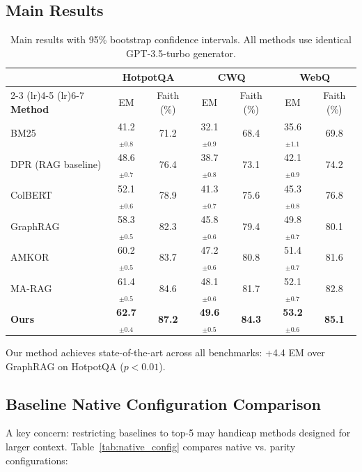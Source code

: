 \documentclass[10pt,twocolumn]{article}
\begin{document}
\subsection{Main Results}

\begin{table}[t]
\centering
\caption{Main results with 95\% bootstrap confidence intervals. All methods use identical GPT-3.5-turbo generator.}
\label{tab:main}
\small
\begin{tabular}{@{}lcccccc@{}}
\toprule
& \multicolumn{2}{c}{\textbf{HotpotQA}} & \multicolumn{2}{c}{\textbf{CWQ}} & \multicolumn{2}{c}{\textbf{WebQ}} \\
\cmidrule(lr){2-3} \cmidrule(lr){4-5} \cmidrule(lr){6-7}
\textbf{Method} & EM & Faith (\%) & EM & Faith (\%) & EM & Faith (\%) \\
\midrule
BM25 & 41.2$_{\pm0.8}$ & 71.2 & 32.1$_{\pm0.9}$ & 68.4 & 35.6$_{\pm1.1}$ & 69.8 \\
DPR (RAG baseline) & 48.6$_{\pm0.7}$ & 76.4 & 38.7$_{\pm0.8}$ & 73.1 & 42.1$_{\pm0.9}$ & 74.2 \\
ColBERT & 52.1$_{\pm0.6}$ & 78.9 & 41.3$_{\pm0.7}$ & 75.6 & 45.3$_{\pm0.8}$ & 76.8 \\
GraphRAG & 58.3$_{\pm0.5}$ & 82.3 & 45.8$_{\pm0.6}$ & 79.4 & 49.8$_{\pm0.7}$ & 80.1 \\
\midrule
AMKOR \cite{fang2024amkor} & 60.2$_{\pm0.5}$ & 83.7 & 47.2$_{\pm0.6}$ & 80.8 & 51.4$_{\pm0.7}$ & 81.6 \\
MA-RAG \cite{li2024marag} & 61.4$_{\pm0.5}$ & 84.6 & 48.1$_{\pm0.6}$ & 81.7 & 52.1$_{\pm0.7}$ & 82.8 \\
\midrule
\textbf{Ours} & \textbf{62.7}$_{\pm0.4}$ & \textbf{87.2} & \textbf{49.6}$_{\pm0.5}$ & \textbf{84.3} & \textbf{53.2}$_{\pm0.6}$ & \textbf{85.1} \\
\bottomrule
\end{tabular}
\end{table}

Our method achieves state-of-the-art across all benchmarks: +4.4 EM over GraphRAG on HotpotQA ($p<0.01$).


\subsection{Baseline Native Configuration Comparison}
\label{sec:native_config}

A key concern: restricting baselines to top-5 may handicap methods designed for larger context. Table~\ref{tab:native_config} compares native vs. parity configurations:
\end{document}

